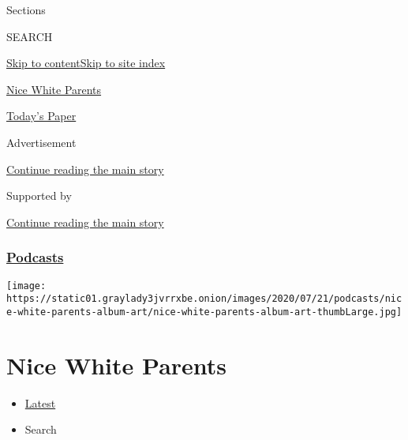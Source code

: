 Sections

SEARCH

\protect\hyperlink{site-content}{Skip to
content}\protect\hyperlink{site-index}{Skip to site index}

\href{https://www.nytimes3xbfgragh.onion/column/nice-white-parents}{Nice
White Parents}

\href{https://myaccount.nytimes3xbfgragh.onion/auth/login?response_type=cookie\&client_id=vi}{}

\href{https://www.nytimes3xbfgragh.onion/section/todayspaper}{Today's
Paper}

Advertisement

\protect\hyperlink{after-top}{Continue reading the main story}

Supported by

\protect\hyperlink{after-sponsor}{Continue reading the main story}

\hypertarget{podcasts}{%
\subsubsection{\texorpdfstring{\href{/spotlight/podcasts}{Podcasts}}{Podcasts}}\label{podcasts}}

\texttt{[image: https://static01.graylady3jvrrxbe.onion/images/2020/07/21/podcasts/nice-white-parents-album-art/nice-white-parents-album-art-thumbLarge.jpg]}

\hypertarget{nice-white-parents}{%
\section{Nice White Parents}\label{nice-white-parents}}

\begin{itemize}
\tightlist
\item
  \protect\hyperlink{stream-panel}{Latest}
\item
  Search
\end{itemize}


